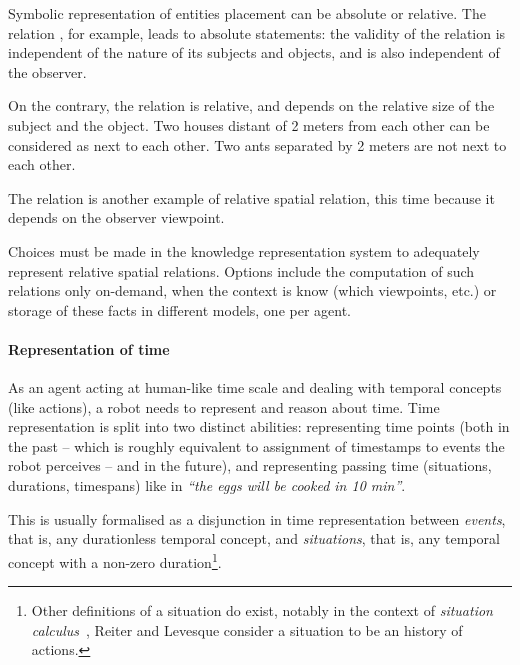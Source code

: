 Symbolic representation of entities placement can be absolute or relative. The
relation , for example, leads to absolute statements: the
validity of the relation is independent of the nature of its subjects and
objects, and is also independent of the observer.

On the contrary, the relation  is relative, and depends on the
relative size of the subject and the object. Two houses distant of 2 meters
from each other can be considered as next to each other. Two ants separated by
2 meters are not next to each other.

The relation  is another example of relative spatial relation,
this time because it depends on the observer viewpoint.


Choices must be made in the knowledge representation system to adequately
represent relative spatial relations. Options include the computation of such
relations only on-demand, when the context is know (which viewpoints, etc.) or
storage of these facts in different models, one per agent.


\paragraph{Representation of time}
\label{sect|time-representation}

As an agent acting at human-like time scale and dealing with temporal concepts
(like actions), a robot needs to represent and reason about
time. Time representation is split into two distinct abilities: representing
time points (both in the past -- which is roughly equivalent to assignment of
timestamps to events the robot perceives -- and in the future), and
representing passing time (situations, durations, timespans) like in
\emph{``the eggs will be cooked in 10 min''}.

This is usually formalised as a disjunction in time representation between
\emph{events}, that is, any durationless temporal concept, and
\emph{situations}, that is, any temporal concept with a non-zero
duration\footnote{Other definitions of a situation do exist, notably in the
context of \emph{situation calculus}~\cite{Levesque1998}, Reiter and Levesque
consider a situation to be an history of actions.}.

